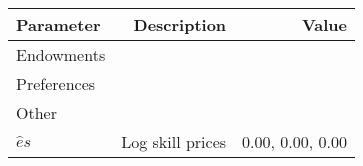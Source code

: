 \begin{tabular}{lrr}
\hline
Parameter & Description  & Value  \\ 
\hline
Endowments &   &   \\ 
Preferences &   &   \\ 
Other &   &   \\ 
$\hat{e}{s}$ & Log skill prices  & 0.00, 0.00, 0.00  \\ 
\hline
\end{tabular}%
